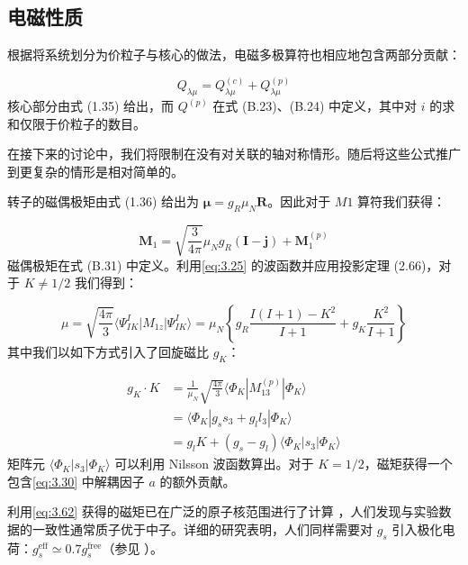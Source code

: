 \subsection{电磁性质}

根据将系统划分为价粒子与核心的做法，电磁多极算符也相应地包含两部分贡献：

\begin{equation}
Q_{\lambda\mu}=Q^{(c)}_{\lambda\mu}+Q^{(p)}_{\lambda\mu}\label{eq:3.60}
\end{equation}
核心部分由式 (1.35) 给出，而 $Q^{(p)}$ 在式 (B.23)、(B.24) 中定义，其中对 $i$ 的求和仅限于价粒子的数目。

在接下来的讨论中，我们将限制在没有对关联的轴对称情形。随后将这些公式推广到更复杂的情形是相对简单的。

转子的磁偶极矩由式 (1.36) 给出为 $\boldsymbol{\mu}=g_{R}\mu_{N}\boldsymbol{R}$。因此对于
$M1$ 算符我们获得：

\begin{equation}
\boldsymbol{M}_{1}=\sqrt{\frac{3}{4\pi}}\mu_{N}g_{R}(\boldsymbol{I}-\boldsymbol{j})+\boldsymbol{M}^{(p)}_{1}\label{eq:3.61}
\end{equation}
磁偶极矩在式 (B.31) 中定义。利用\ref{eq:3.25} 的波函数并应用投影定理 (2.66)，对于 $K\neq1/2$
我们得到：

\begin{equation}
\mu=\sqrt{\frac{4\pi}{3}}\langle\Psi^{I}_{IK}|M_{1z}|\Psi^{I}_{IK}\rangle=\mu_{N}\left\{ g_{R}\frac{I(I+1)-K^{2}}{I+1}+g_{K}\frac{K^{2}}{I+1}\right\} \label{eq:3.62}
\end{equation}
其中我们以如下方式引入了回旋磁比 $g_{K}$：

\begin{align}
g_{K}\cdot K & =\frac{1}{\mu_{N}}\sqrt{\frac{4\pi}{3}}\langle\Phi_{K}|M^{(p)}_{13}|\Phi_{K}\rangle\nonumber \\
 & =\langle\Phi_{K}|g_{s}s_{3}+g_{l}l_{3}|\Phi_{K}\rangle\nonumber \\
 & =g_{l}K+(g_{s}-g_{l})\langle\Phi_{K}|s_{3}|\Phi_{K}\rangle\label{eq:3.63}
\end{align}
矩阵元 $\langle\Phi_{K}|s_{3}|\Phi_{K}\rangle$ 可以利用 Nilsson 波函数算出。对于
$K=1/2$，磁矩获得一个包含\ref{eq:3.30} 中解耦因子 $a$ 的额外贡献。

利用\ref{eq:3.62} 获得的磁矩已在广泛的原子核范围进行了计算 \cite[第 653 页]{MN59,NN65}，人们发现与实验数据的一致性通常质子优于中子。详细的研究表明，人们同样需要对
$g_{s}$ 引入极化电荷：$g^{\text{eff}}_{s}\simeq0.7g^{\text{free}}_{s}$（参见
\cite[第 302 页起]{BM75}）。

